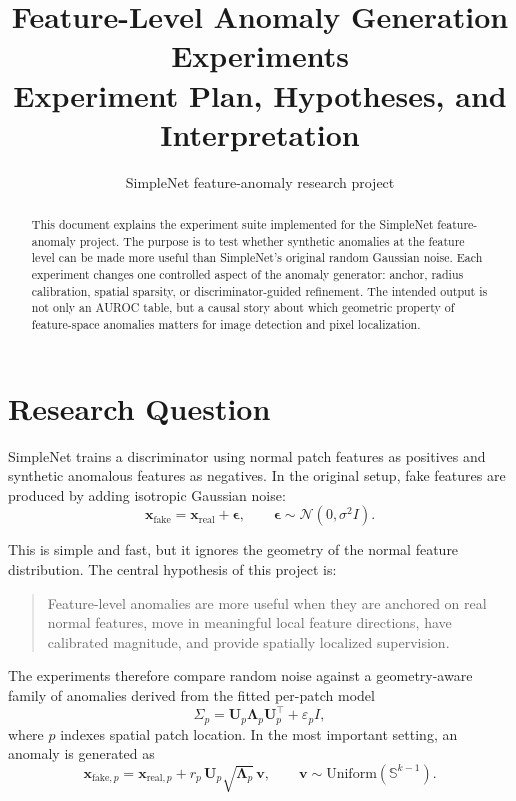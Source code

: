 \documentclass[11pt]{article}
\title{Feature-Level Anomaly Generation Experiments\\
       \large Experiment Plan, Hypotheses, and Interpretation}
\author{SimpleNet feature-anomaly research project}
\date{}
\newcommand{\Up}{\mathbf{U}_p}
\newcommand{\Lp}{\boldsymbol{\Lambda}_p}
\begin{document}
\maketitle

\begin{abstract}
This document explains the experiment suite implemented for the SimpleNet
feature-anomaly project. The purpose is to test whether synthetic anomalies at
the feature level can be made more useful than SimpleNet's original random
Gaussian noise. Each experiment changes one controlled aspect of the anomaly
generator: anchor, radius calibration, spatial sparsity, or discriminator-guided
refinement. The intended output is not only an AUROC table, but a causal story
about which geometric property of feature-space anomalies matters for image
detection and pixel localization.
\end{abstract}

\tableofcontents

\section{Research Question}

SimpleNet trains a discriminator using normal patch features as positives and
synthetic anomalous features as negatives. In the original setup, fake features
are produced by adding isotropic Gaussian noise:
\begin{equation}
  \mathbf{x}_{\mathrm{fake}}
    = \mathbf{x}_{\mathrm{real}} + \boldsymbol{\epsilon},
  \qquad
  \boldsymbol{\epsilon} \sim \mathcal{N}(0, \sigma^2 I).
\end{equation}

\noindent
This is simple and fast, but it ignores the geometry of the normal feature
distribution. The central hypothesis of this project is:

\begin{quote}
Feature-level anomalies are more useful when they are anchored on real normal
features, move in meaningful local feature directions, have calibrated
magnitude, and provide spatially localized supervision.
\end{quote}

\noindent
The experiments therefore compare random noise against a geometry-aware family
of anomalies derived from the fitted per-patch model
\begin{equation}
  \Sigma_p = \Up \Lp \Up^\top + \varepsilon_p I,
\end{equation}
where $p$ indexes spatial patch location. In the most important setting, an
anomaly is generated as
\begin{equation}
  \mathbf{x}_{\mathrm{fake},p}
    =
  \mathbf{x}_{\mathrm{real},p}
    +
  r_p\, \Up \sqrt{\Lp}\,\mathbf{v},
  \qquad
  \mathbf{v} \sim \mathrm{Uniform}(\mathbb{S}^{k-1}).
\end{equation}
\end{document}
